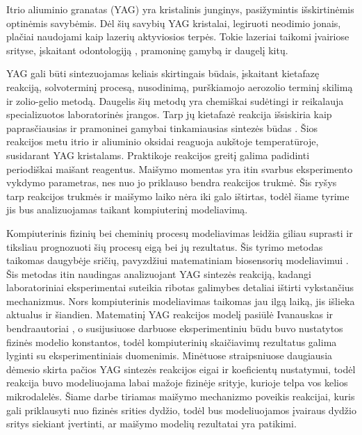 
Itrio aliuminio granatas (YAG) yra kristalinis junginys, pasižymintis išskirtinėmis optinėmis savybėmis. Dėl šių savybių YAG kristalai, legiruoti neodimio jonais, plačiai naudojami kaip lazerių aktyviosios terpės. Tokie lazeriai taikomi įvairiose srityse, įskaitant odontologiją \cite{valentiUseErYAG2021}, pramoninę gamybą \cite{dubeyExperimentalStudyNd2008} ir daugelį kitų.

YAG gali būti sintezuojamas keliais skirtingais būdais, įskaitant kietafazę reakciją, solvoterminį procesą, nusodinimą, purškiamojo aerozolio terminį skilimą ir zolio-gelio metodą. Daugelis šių metodų yra chemiškai sudėtingi ir reikalauja specializuotos laboratorinės įrangos. Tarp jų kietafazė reakcija išsiskiria kaip paprasčiausias ir pramoninei gamybai tinkamiausias sintezės būdas \cite{zhangNovelSynthesisYAG2005}. Šios reakcijos metu itrio ir aliuminio oksidai reaguoja aukštoje temperatūroje, susidarant YAG kristalams. Praktikoje reakcijos greitį galima padidinti periodiškai maišant reagentus. Maišymo momentas yra itin svarbus eksperimento vykdymo parametras, nes nuo jo priklauso bendra reakcijos trukmė. Šis ryšys tarp reakcijos trukmės ir maišymo laiko nėra iki galo ištirtas, todėl šiame tyrime jis bus analizuojamas taikant kompiuterinį modeliavimą.

Kompiuterinis fizinių bei cheminių procesų modeliavimas leidžia giliau suprasti ir tiksliau prognozuoti šių procesų eigą bei jų rezultatus. Šis tyrimo metodas taikomas daugybėje sričių, pavyzdžiui matematiniam biosensorių modeliavimui \cite{baronasNonlinearEffectsDiffusion2017, baronasNonlinearEffectsPartitioning2024}. Šis metodas itin naudingas analizuojant YAG sintezės reakciją, kadangi laboratoriniai eksperimentai suteikia ribotas galimybes detaliai ištirti vykstančius mechanizmus. Nors kompiuterinis modeliavimas taikomas jau ilgą laiką, jis išlieka aktualus ir šiandien. Matematinį YAG reakcijos modelį pasiūlė Ivanauskas ir bendraautoriai \cite{ivanauskasModellingSolidState2005}, o susijusiuose darbuose \cite{ivanauskasComputationalModellingYAG2009,mackeviciusCloserLookComputer2012} eksperimentiniu būdu buvo nustatytos fizinės modelio konstantos, todėl kompiuterinių skaičiavimų rezultatus galima lyginti su eksperimentiniais duomenimis. Minėtuose straipsniuose daugiausia dėmesio skirta pačios YAG sintezės reakcijos eigai ir koeficientų nustatymui, todėl reakcija buvo modeliuojama labai mažoje fizinėje srityje, kurioje telpa vos kelios mikrodalelės. Šiame darbe tiriamas maišymo mechanizmo poveikis reakcijai, kuris gali priklausyti nuo fizinės srities dydžio, todėl bus modeliuojamos įvairaus dydžio sritys siekiant įvertinti, ar maišymo modelių rezultatai yra patikimi.

